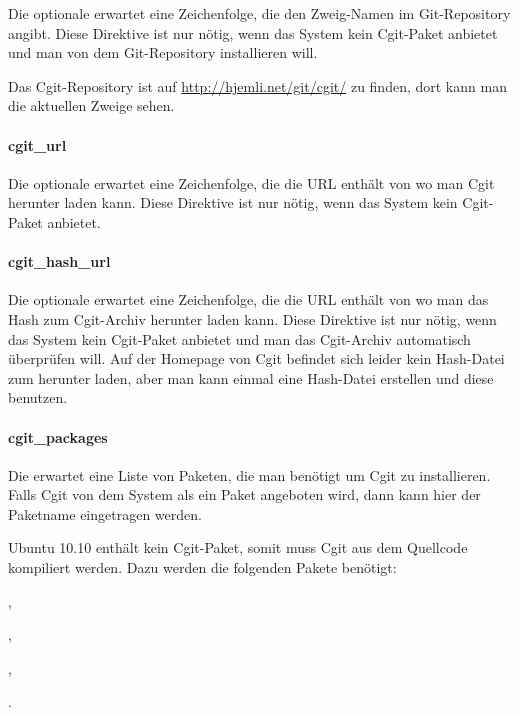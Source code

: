 Die optionale  erwartet eine Zeichenfolge, die den Zweig-Namen
im Git-Repository angibt. Diese Direktive ist nur nötig, wenn
das System kein Cgit-Paket anbietet und man von dem Git-Repository installieren will.

Das Cgit-Repository ist auf \url{http://hjemli.net/git/cgit/} zu finden, dort kann man
die aktuellen Zweige sehen.

\paragraph{cgit\_url}

Die optionale  erwartet eine Zeichenfolge, die die URL
enthält von wo man Cgit herunter laden kann. Diese Direktive ist nur nötig, wenn
das System kein Cgit-Paket anbietet.

\paragraph{cgit\_hash\_url}

Die optionale  erwartet eine Zeichenfolge, die die
URL enthält von wo man das Hash zum Cgit-Archiv herunter laden kann. Diese
Direktive ist nur nötig, wenn das System kein Cgit-Paket anbietet und man das
Cgit-Archiv automatisch überprüfen will. Auf der Homepage von Cgit befindet sich
leider kein Hash-Datei zum herunter laden, aber man kann einmal eine Hash-Datei
erstellen und diese benutzen.

\paragraph{cgit\_packages}

Die  erwartet eine Liste von Paketen, die man benötigt
um Cgit zu installieren. Falls Cgit von dem System als ein Paket angeboten wird,
dann kann hier der Paketname eingetragen werden.

Ubuntu 10.10 enthält kein Cgit-Paket, somit muss Cgit aus dem Quellcode
kompiliert werden. Dazu werden die folgenden Pakete benötigt:
\begin{asparaitem}
\item {},
\item {},
\item {},
\item {}.
\end{asparaitem}

